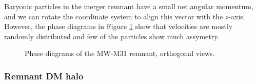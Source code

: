 \documentclass[twocolumn]{aastex63}
\newcommand{\todo}{\color{red}{TODO}\color{black}\hspace{2mm}}
\begin{document}

Baryonic particles in the merger remnant have a small net angular momentum, and we can rotate the coordinate system to align this vector with the $z$-axis. However, the phase diagrams in Figure \ref{fig:rem_phase} show that velocities are mostly randomly distributed and few of the particles show much assymetry.

\begin{figure}[htb!]
	\caption{Phase diagrams of the MW-M31 remnant, orthogonal views.
	\label{fig:rem_phase}}
\end{figure}

\todo{alignment between particles of different origin?}

\subsubsection{Remnant DM halo}

\end{document}
